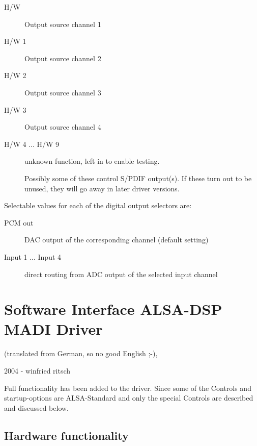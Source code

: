 \documentclass[a4paper,8pt,english]{sphinxmanual}
\begin{document}
\begin{description}
\item[{H/W}] \leavevmode
Output source channel 1

\item[{H/W 1}] \leavevmode
Output source channel 2

\item[{H/W 2}] \leavevmode
Output source channel 3

\item[{H/W 3}] \leavevmode
Output source channel 4

\item[{H/W 4 ... H/W 9}] \leavevmode
unknown function, left in to enable testing.

Possibly some of these control S/PDIF output(s).
If these turn out to be unused, they will go away in later driver versions.

\end{description}

Selectable values for each of the digital output selectors are:
\begin{description}
\item[{PCM out}] \leavevmode
DAC output of the corresponding channel (default setting)

\item[{Input 1 ... Input 4}] \leavevmode
direct routing from ADC output of the selected input channel

\end{description}


\section{Software Interface ALSA-DSP MADI Driver}
\label{sound/cards/hdspm:software-interface-alsa-dsp-madi-driver}\label{sound/cards/hdspm::doc}
(translated from German, so no good English ;-),

2004 - winfried ritsch

Full functionality has been added to the driver. Since some of
the Controls and startup-options  are ALSA-Standard and only the
special Controls are described and discussed below.


\subsection{Hardware functionality}
\label{sound/cards/hdspm:hardware-functionality}
\end{document}
